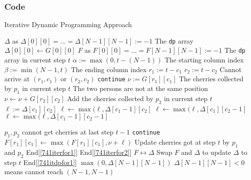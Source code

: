 \subsubsection{Code}
\begin{algorithm}[H]
\caption{Iterative Dynamic Programming Approach}
\begin{algorithmic}[1]
\State $\Delta$ as $\Delta[0][0] =\ldots = \Delta[N-1][N-1]:=-1$ \Comment The \texttt{dp} array
\State $\Delta[0][0]\gets G[0][0]$
 \label{741itdpfor1}
\State $F$ as $F[0][0] = \ldots = F[N-1][N-1] := -1$ \Comment The \texttt{dp} array in current step $t$
\State $\alpha:=\max(0, t-(N-1))$ \Comment The starting column index
\State $\beta:=\min(N-1, t)$ \Comment The ending column index
 \label{741iterfor1}
 \label{741iterfor2}
\State $r_1:=t-c_1$
\State $r_2:=t-c_2$
 \Comment Cannot arrive at $(r_1, c_1)$ or $(r_2,c_2)$ \State \texttt{continue}
\EndIf
\State $\nu:=G[r_1][c_1]$ \Comment The cherries collected by $p_1$ in current step $t$
 \Comment The two persons are not at the same position
\State $\nu \gets \nu + G[r_2][c_2]$ \Comment Add the cherries collected by $p_2$ in current step $t$
\EndIf
\State $\ell:=\Delta[c_1][c_2]$ \label{741itexplain_start}
\State $\ell\gets \max(\ell, \Delta[c_1-1][c_2]$
\EndIf
{}
\State $\ell\gets \max(\ell, \Delta[c_1][c_2-1]$
\EndIf
{}
\State $\ell\gets \max(\ell, \Delta[c_1-1][c_2-1]$
\EndIf \label{741itexplain_end}
\end{algorithmic}
\end{algorithm}
\begin{algorithm} [H]
\begin{algorithmic}[1]
 \Comment $p_1, p_2$ cannot get cherries at last step $t-1$
\State \texttt{continue}
\EndIf
\State $F[r_1][c_1] \gets \max(F[r_1][c_1], \nu + \ell)$ \Comment Update cherries got at step $t$ by $p_1$ and $p_2$
\EndFor \Comment End[\ref{741iterfor1}]
\EndFor \Comment End[\ref{741iterfor2}]
\State $F\leftrightarrow \Delta$ \Comment Swap $F$ and $\Delta$ to update $\Delta$ to step $t$
\EndFor \Comment End[\ref{741itdpfor1}]
\State \Return $\max(0, \Delta[N-1][N-1])$ \Comment $\Delta[N-1][N-1]<0$ means cannot reach $(N-1, N-1)$
\EndProcedure
\end{algorithmic}
\end{algorithm}
